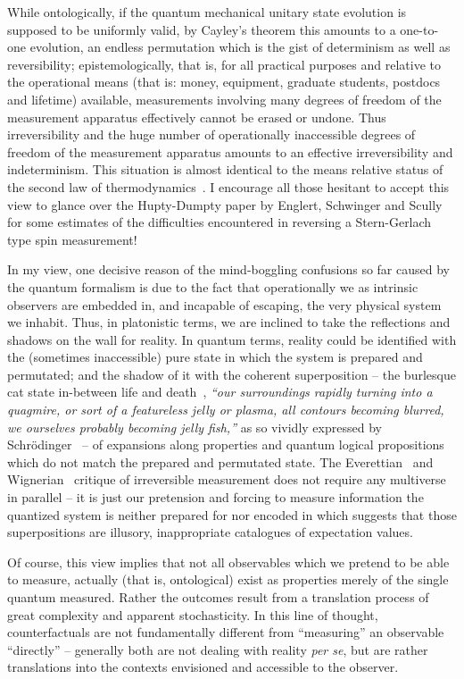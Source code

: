 \documentclass[%
 superscriptaddress,
 preprint,
 showpacs,
 showkeys,
 nofootinbib,
  amsmath,amssymb,
  aps,
  longbibliography,
  floatfix,
 ]{revtex4-1}
\theoremstyle{definition}
\begin{document}
While
ontologically,
if the quantum mechanical unitary state evolution is supposed to be uniformly valid,
by Cayley's theorem this amounts to a one-to-one evolution, an endless permutation which is the gist of determinism as well as reversibility;
epistemologically, that is, for all practical purposes and relative to the operational
means (that is: money, equipment, graduate students, postdocs and lifetime) available,
measurements involving many degrees of freedom of the measurement apparatus effectively cannot be erased or undone.
Thus irreversibility and the huge number of operationally inaccessible degrees of freedom of the
measurement apparatus amounts to an effective irreversibility and indeterminism.
This situation is almost identical to the means relative status of the second law of thermodynamics~\cite{Myrvold2011237}.
I encourage all those hesitant to accept this view to glance over the Hupty-Dumpty paper by Englert, Schwinger and Scully~\cite{engrt-sg-I,engrt-sg-II}
for some estimates of the difficulties encountered in reversing a Stern-Gerlach type spin measurement!

In my view, one decisive reason of the mind-boggling confusions so far caused by the quantum formalism is due to the fact that operationally we as
intrinsic observers are embedded in, and incapable of escaping, the very physical system we inhabit.
Thus, in platonistic terms, we are inclined to take the reflections and shadows on the wall for reality.
In quantum terms, reality could be identified with the (sometimes inaccessible) pure state in which the system is prepared and permutated;
and the shadow of it with the coherent superposition -- the burlesque cat state in-between life and death~\cite{schrodinger},
{\em ``our surroundings rapidly
turning into a quagmire, or sort of a featureless jelly or plasma, all contours
becoming blurred, we ourselves probably becoming jelly fish,''} as so vividly expressed
by Schr\"odinger~\cite{schroedinger-interpretation} -- of expansions along properties and quantum logical propositions which do not match the prepared and permutated state.
The Everettian~\cite{everett} and Wignerian~\cite{wigner:mb} critique of irreversible measurement does not require any multiverse in parallel --
it is just our pretension and forcing to
measure information the quantized system is neither prepared for nor encoded in which suggests that those superpositions are illusory,
inappropriate catalogues of expectation values.

Of course, this view implies that not all observables which we pretend to be able to measure, actually (that is, ontological)
exist as properties merely of the single quantum measured.
Rather the outcomes result from a translation process of great complexity and apparent stochasticity.
In this line of thought, counterfactuals are not fundamentally different from ``measuring'' an observable ``directly'' --
generally both are not dealing with reality {\it per se},
but are rather translations into the contexts envisioned and accessible to the observer.
\end{document}
